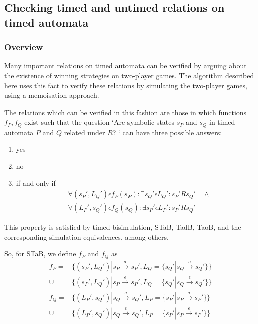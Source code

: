 \documentclass[a4paper]{llncs}
\begin{document}
\subsection{Checking timed and untimed relations on timed automata}

\subsubsection{Overview}

Many important relations on timed automata can be verified by arguing
about the existence of winning strategies on two-player games. The
algorithm described here uses this fact to verify these relations
by simulating the two-player games, using a memoisation approach.

The relations which can be verified in this fashion are those in which
functions $f_P, f_Q$ exist such that
the question `Are symbolic states $s_P$ and $s_Q$ in timed automata $P$ and $Q$
related under $R$? ` can have three possible answers:
\begin{enumerate}
\item yes
\item no
\item if and only if 
  \begin{align*} 
    &\forall (s_P', L_Q') \epsilon f_P(s_P): \exists s_Q' \epsilon
    L_Q': s_P' R s_Q' \quad \wedge \\
    &\forall (L_P', s_Q') \epsilon f_Q(s_Q): \exists s_P' \epsilon
    L_P': s_P' R s_Q'
  \end{align*} 
\end{enumerate}

This property is satisfied by timed bisimulation, STaB, TadB, TaoB,
and the corresponding simulation equivalences, among others.

So, for STaB, we define $f_P$ and $f_Q$ as
\begin{align*}
  f_P = & \{(s_P', L_Q') | s_P \xrightarrow{a} s_P', 
  L_Q=\{ s_Q' | s_Q \xrightarrow{a} s_Q'\}\} \\
  \cup & \{(s_P', L_Q') | s_P \xrightarrow{\epsilon} s_P', 
  L_Q=\{ s_Q' | s_Q \xrightarrow{\epsilon} s_Q'\}\} \\
  f_Q = & \{(L_P', s_Q') | s_Q \xrightarrow{a} s_Q', 
  L_P=\{ s_P' | s_P \xrightarrow{a} s_P'\}\} \\
  \cup & \{(L_P', s_Q') | s_Q \xrightarrow{\epsilon} s_Q', 
  L_P=\{ s_P' | s_P \xrightarrow{\epsilon} s_P'\}\} 
\end{align*}
\end{document}
